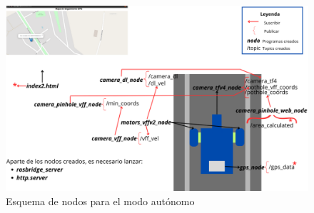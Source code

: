 \begin{figure} [h!]
	\begin{center}
			\includegraphics[width=15cm]{figs/cap7/esquema_nodos_vff_ampliado.png}
		\end{center}
	\caption{Esquema de nodos para el modo autónomo}
	\label{fig:nodosvff}
\end{figure}



